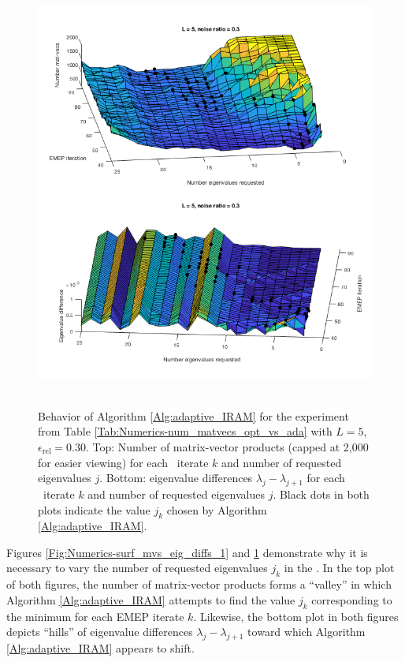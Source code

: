 \begin{enumerate}
\begin{figure}[H]
\centering
\hbox{\hspace{-0.5cm} \includegraphics[scale=0.65]{Numerics-surf_num_mvs_and_eig_diffs_2} }\vspace{0.0cm}
	\caption{Behavior of Algorithm \ref{Alg:adaptive_IRAM} for the experiment from Table \ref{Tab:Numerics-num_matvecs_opt_vs_ada} with $L=5$, $\epsilon_\text{rel}=0.30$.  Top: Number of matrix-vector products (capped at 2,000 for easier viewing) for each \emep \ iterate $k$ and number of requested eigenvalues $j$. Bottom: eigenvalue differences $\lambda_j - \lambda_{j+1}$ for each \emep \ iterate $k$ and number of requested eigenvalues $j$.  Black dots in both plots indicate the value $j_k$ chosen by Algorithm \ref{Alg:adaptive_IRAM}.}
\label{Fig:Numerics-surf_mvs_eig_diffs_2}
\end{figure}



Figures \ref{Fig:Numerics-surf_mvs_eig_diffs_1} and \ref{Fig:Numerics-surf_mvs_eig_diffs_2} demonstrate why it is necessary to vary the number of requested eigenvalues $j_k$ in the \emep.
In the top plot of both figures, the number of matrix-vector products forms a ``valley'' in which Algorithm \ref{Alg:adaptive_IRAM} attempts to find the value $j_k$ corresponding to the minimum for each EMEP iterate $k$.
Likewise, the bottom plot in both figures depicts ``hills'' of eigenvalue differences $\lambda_{j} - \lambda_{j+1}$ toward which Algorithm \ref{Alg:adaptive_IRAM} appears to shift.



\end{enumerate}
